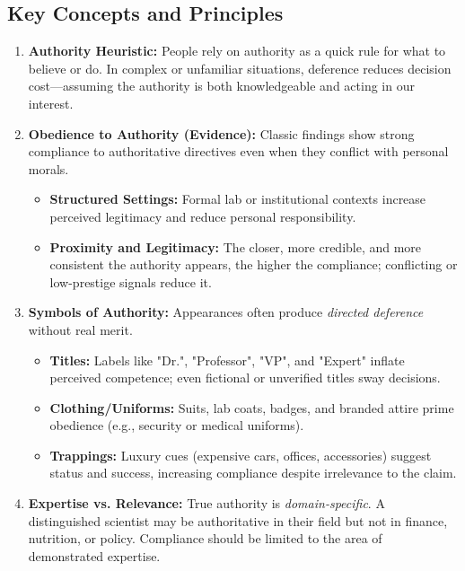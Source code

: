 \subsection*{Key Concepts and Principles}
\begin{enumerate}
    \item \textbf{Authority Heuristic:} People rely on authority as a quick rule for what to believe or do. In complex or unfamiliar situations, deference reduces decision cost—assuming the authority is both knowledgeable and acting in our interest.

    \item \textbf{Obedience to Authority (Evidence):} Classic findings show strong compliance to authoritative directives even when they conflict with personal morals.
    \begin{itemize}
        \item \textbf{Structured Settings:} Formal lab or institutional contexts increase perceived legitimacy and reduce personal responsibility.
        \item \textbf{Proximity and Legitimacy:} The closer, more credible, and more consistent the authority appears, the higher the compliance; conflicting or low-prestige signals reduce it.
    \end{itemize}

    \item \textbf{Symbols of Authority:} Appearances often produce \emph{directed deference} without real merit.
    \begin{itemize}
        \item \textbf{Titles:} Labels like "Dr.", "Professor", "VP", and "Expert" inflate perceived competence; even fictional or unverified titles sway decisions.
        \item \textbf{Clothing/Uniforms:} Suits, lab coats, badges, and branded attire prime obedience (e.g., security or medical uniforms).
        \item \textbf{Trappings:} Luxury cues (expensive cars, offices, accessories) suggest status and success, increasing compliance despite irrelevance to the claim.
    \end{itemize}

    \item \textbf{Expertise vs. Relevance:} True authority is \emph{domain-specific}. A distinguished scientist may be authoritative in their field but not in finance, nutrition, or policy. Compliance should be limited to the area of demonstrated expertise.


\end{enumerate}
